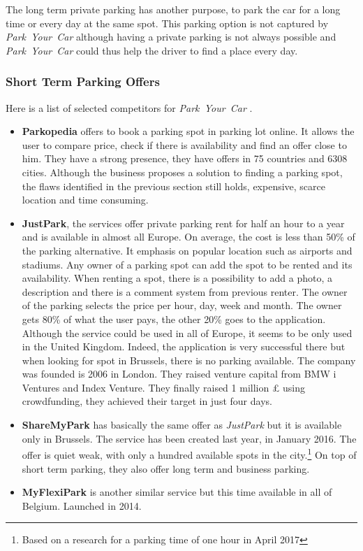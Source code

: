 \documentclass[12pt,a4paper,oneside]{book}
\newcommand{\bp}{\textit{Park~Your~Car }}
\begin{document}
The long term private parking has another purpose, to park the car for a long time or every day at the same spot. This parking option is not captured by \bp although having a private parking is not always possible and \bp could thus help the driver to find a place every day.

\subsubsection{Short Term Parking Offers}

Here is a list of selected competitors for \bp .

\begin{itemize}
\item \textbf{Parkopedia} offers to book a parking spot in parking lot online. It allows the user to compare price, check if there is availability and find an offer close to him. They have a strong presence, they have offers in 75 countries and 6308 cities. Although the business proposes a solution to finding a parking spot, the flaws identified in the previous section still holds, expensive, scarce location and time consuming.
\item \textbf{JustPark}, the services offer private parking rent for half an hour to a year and is available in almost all Europe. On average, the cost is less than 50\% of the parking alternative. It emphasis on popular location such as airports and stadiums. Any owner of a parking spot can add the spot to be rented and its availability. When renting a spot, there is a possibility to add a photo, a description and there is a comment system from previous renter. The owner of the parking selects the price per hour, day, week and month. The owner gets 80\% of what the user pays, the other 20\% goes to the application. Although the service could be used in all of Europe, it seems to be only used in the United Kingdom. Indeed, the application is very successful there but when looking for spot in Brussels, there is no parking available. The company was founded is 2006 in London. They raised venture capital from BMW i Ventures\cite{bmwi} and Index Venture.\cite{iven} They finally raised 1 million £ using crowdfunding, they achieved their target in just four days.\cite{crowd}
\item \textbf{ShareMyPark} has basically the same offer as \textit{JustPark} but it is available only in Brussels. The service has been created last year, in January 2016. The offer is quiet weak, with only a hundred available spots in the city.\footnote{Based on a research for a parking time of one hour in April 2017} On top of short term parking, they also offer long term and business parking.
\item \textbf{MyFlexiPark} is another similar service but this time available in all of Belgium. Launched in 2014.
\end{itemize}
\end{document}
